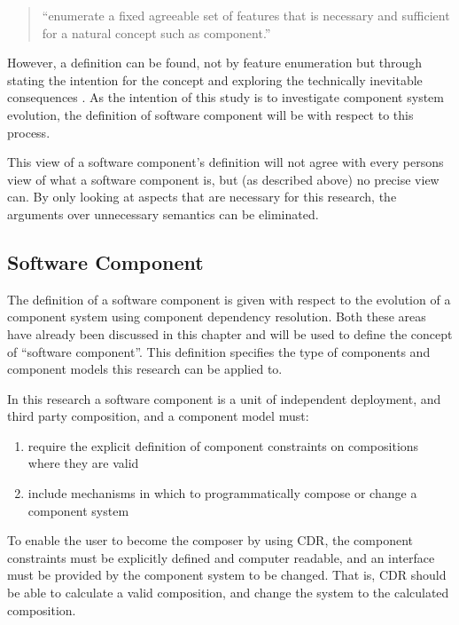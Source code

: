 \begin{quotation} 
``enumerate a fixed agreeable set of features that is necessary and sufficient for a natural concept such as component.''
\end{quotation}

However, a definition can be found, not by feature enumeration but through stating the intention for the concept
and exploring the technically inevitable consequences \citep{Szyperski2002}. 
As the intention of this study is to investigate component system evolution,
the definition of software component will be with respect to this process.

This view of a software component's definition will not agree with every persons view of what a software component is, but (as described above) no precise view can.
By only looking at aspects that are necessary for this research, the arguments over unnecessary semantics can be eliminated. 

\subsection{Software Component}
The definition of a software component is given with respect to the evolution of a component system using component dependency resolution.
Both these areas have already been discussed in this chapter and will be used to define the concept of ``software component''.
This definition specifies the type of components and component models this research can be applied to.

In this research a software component is a unit of independent deployment, and third party composition,
and a component model must:
\begin{enumerate}
  \item require the explicit definition of component constraints on compositions where they are valid 
  \item include mechanisms in which to programmatically compose or change a component system
\end{enumerate}

To enable the user to become the composer by using CDR, the component constraints must be explicitly defined and computer readable,
and an interface must be provided by the component system to be changed. 
That is, CDR should be able to calculate a valid composition, and change the system to the calculated composition.

